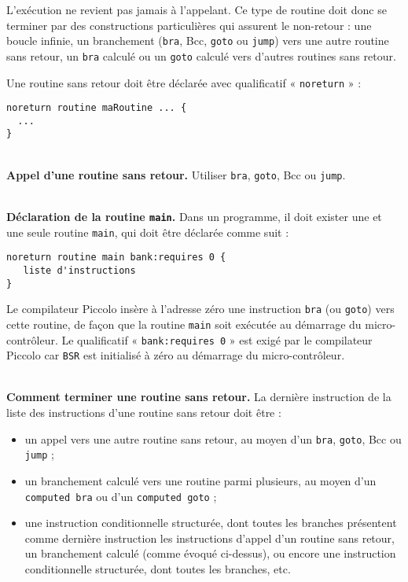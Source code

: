L’exécution ne revient pas jamais à l’appelant. Ce type de routine doit donc se terminer par des constructions particulières qui assurent le non-retour : une boucle infinie, un branchement (\texttt{bra}, Bcc, \texttt{goto} ou \texttt{jump}) vers une autre routine sans retour, un \texttt{bra} calculé ou un \texttt{goto} calculé vers d’autres routines sans retour.

Une routine sans retour doit être déclarée avec qualificatif « \texttt{noreturn} » :
\begin{lstlisting}[language=piccolo]
noreturn routine maRoutine ... {
  ...
}
\end{lstlisting}

~\\
\textbf{Appel d’une routine sans retour.} Utiliser \texttt{bra}, \texttt{goto}, Bcc ou \texttt{jump}.


~\\
\textbf{Déclaration de la routine \texttt{main}.} Dans un programme, il doit exister une et une seule routine \texttt{main}, qui doit être déclarée comme suit :

\begin{lstlisting}[language=piccolo]
noreturn routine main bank:requires 0 {
   liste d'instructions
}

\end{lstlisting}

Le compilateur Piccolo insère à l’adresse zéro une instruction \texttt{bra} (ou \texttt{goto}) vers cette routine, de façon que la routine \texttt{main} soit exécutée au démarrage du micro-contrôleur. Le qualificatif « \texttt{bank:requires 0} » est exigé par le compilateur Piccolo car \texttt{BSR} est initialisé à zéro au démarrage du micro-contrôleur.


~\\
\textbf{Comment terminer une routine sans retour.} La dernière instruction de la liste des instructions d’une routine sans retour doit être :
\begin{itemize}
  \item un appel vers une autre routine sans retour, au moyen d’un \texttt{bra}, \texttt{goto}, Bcc ou \texttt{jump} ;
  \item un branchement calculé vers une routine parmi plusieurs, au moyen d’un \texttt{computed bra} ou d’un \texttt{computed goto} ;
  \item une instruction conditionnelle structurée, dont toutes les branches présentent comme dernière instruction les instructions d’appel d’un routine sans retour, un branchement calculé (comme évoqué ci-dessus), ou encore une instruction conditionnelle structurée, dont toutes les branches, etc.

\end{itemize}

